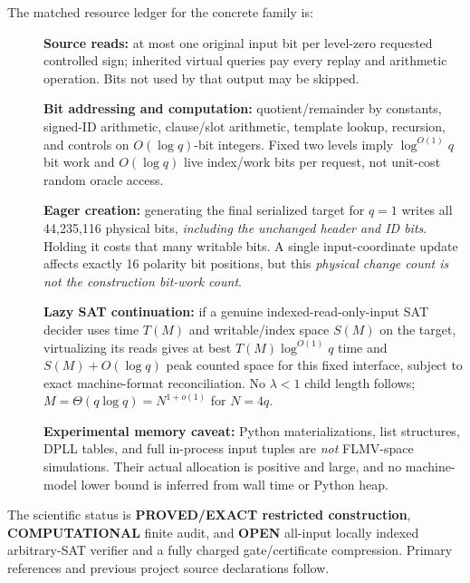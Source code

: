 \documentclass[11pt]{article}
\newcommand{\OPEN}{\textbf{OPEN}}
\begin{document}
The matched resource ledger for the concrete family is:
\begin{description}
\item[] \textbf{Source reads:} at most one original input bit per level-zero requested controlled sign; inherited virtual queries pay every replay and arithmetic operation. Bits not used by that output may be skipped.
\item[] \textbf{Bit addressing and computation:} quotient/remainder by constants, signed-ID arithmetic, clause/slot arithmetic, template lookup, recursion, and controls on $O(\log q)$-bit integers. Fixed two levels imply $\log^{O(1)}q$ bit work and $O(\log q)$ live index/work bits per request, not unit-cost random oracle access.
\item[] \textbf{Eager creation:} generating the final serialized target for $q=1$ writes all 44,235,116 physical bits, \emph{including the unchanged header and ID bits}. Holding it costs that many writable bits. A single input-coordinate update affects exactly 16 polarity bit positions, but this \emph{physical change count is not the construction bit-work count}.
\item[] \textbf{Lazy SAT continuation:} if a genuine indexed-read-only-input SAT decider uses time $T(M)$ and writable/index space $S(M)$ on the target, virtualizing its reads gives at best $T(M)\log^{O(1)}q$ time and $S(M)+O(\log q)$ peak counted space for this fixed interface, subject to exact machine-format reconciliation. No $\lambda<1$ child length follows; $M=\Theta(q\log q)=N^{1+o(1)}$ for $N=4q$.
\item[] \textbf{Experimental memory caveat:} Python materializations, list structures, DPLL tables, and full in-process input tuples are \emph{not} FLMV-space simulations. Their actual allocation is positive and large, and no machine-model lower bound is inferred from wall time or Python heap.
\end{description}

The scientific status is \textbf{PROVED/EXACT restricted construction}, \textbf{COMPUTATIONAL} finite audit, and \OPEN{} all-input locally indexed arbitrary-SAT verifier and a fully charged gate/certificate compression. Primary references and previous project source declarations follow.
\end{document}
